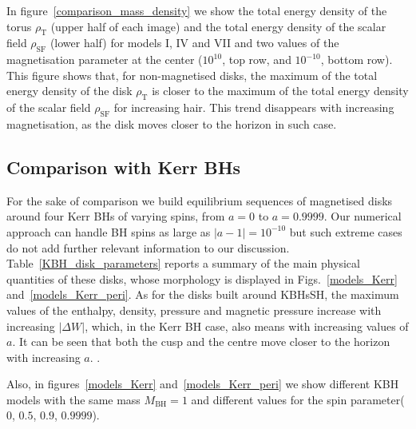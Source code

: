 \documentclass[twocolumn,aps,showpacs,showkeys,prd,superscriptaddress,byrevtex, amsmath]{revtex4-1}
\begin{document}
In figure~\ref{comparison_mass_density} we show the total energy density of the torus $\rho_{\mathrm{T}}$ (upper half of each image) and the total energy density of the scalar field $\rho_{\mathrm{SF}}$ (lower half) for models I, IV and VII and two  values of the magnetisation parameter at the center ($10^{10}$, top row, and $10^{-10}$, bottom row). This figure shows that, for non-magnetised disks, the maximum of the total energy density of the disk $\rho_{\mathrm{T}}$ is closer to the maximum of the total energy density of the scalar field $\rho_{\mathrm{SF}}$ for increasing hair. This trend disappears with increasing magnetisation, as the disk moves closer to the horizon in such case.

\subsection{Comparison with Kerr BHs}

For the sake of comparison we build equilibrium sequences of magnetised disks around four Kerr BHs of varying spins, from $a=0$ to $a=0.9999$. Our numerical approach can handle BH spins as large as $|a-1|=10^{-10}$  but such extreme cases do not add further relevant information to our discussion. Table~\ref{KBH_disk_parameters} reports a summary of the main physical quantities of these disks, whose morphology is displayed in Figs.~\ref{models_Kerr} and~\ref{models_Kerr_peri}. As for the disks built around KBHsSH, the maximum values of the enthalpy, density, pressure and magnetic pressure increase with increasing $|\Delta W|$, which, in the Kerr BH case, also means with increasing values of $a$. It can be seen that both the cusp and the centre move closer to the horizon with increasing $a$. .  

Also, in figures~\ref{models_Kerr} and~\ref{models_Kerr_peri} we show different KBH models with the same mass $M_{\mathrm{BH}} = 1$ and different values for the spin parameter($0$, $0.5$, $0.9$, $0.9999$). 



\end{document}

